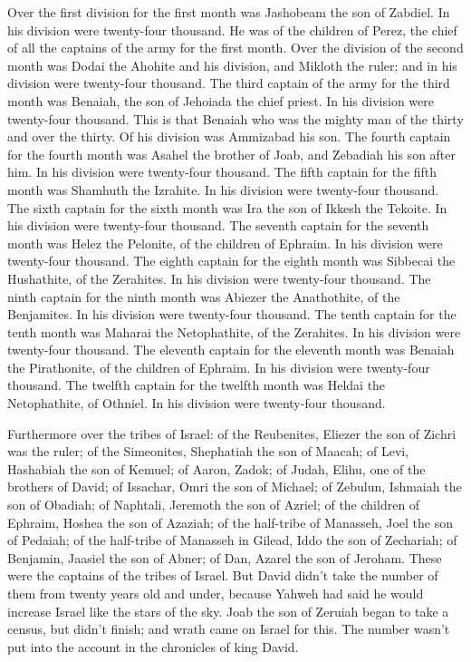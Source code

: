 Over the first division for the first month was Jashobeam
the son of Zabdiel. In his division were twenty-four thousand.
 He was of the children of Perez, the chief of all the
captains of the army for the first month.  Over the
division of the second month was Dodai the Ahohite and his division, and
Mikloth the ruler; and in his division were twenty-four thousand.
 The third captain of the army for the third month was
Benaiah, the son of Jehoiada the chief priest. In his division were
twenty-four thousand.  This is that Benaiah who was the
mighty man of the thirty and over the thirty. Of his division was
Ammizabad his son.  The fourth captain for the fourth
month was Asahel the brother of Joab, and Zebadiah his son after him. In
his division were twenty-four thousand.  The fifth captain
for the fifth month was Shamhuth the Izrahite. In his division were
twenty-four thousand.  The sixth captain for the sixth
month was Ira the son of Ikkesh the Tekoite. In his division were
twenty-four thousand.  The seventh captain for the
seventh month was Helez the Pelonite, of the children of Ephraim. In his
division were twenty-four thousand.  The eighth captain
for the eighth month was Sibbecai the Hushathite, of the Zerahites. In
his division were twenty-four thousand.  The ninth
captain for the ninth month was Abiezer the Anathothite, of the
Benjamites. In his division were twenty-four thousand. 
The tenth captain for the tenth month was Maharai the Netophathite, of
the Zerahites. In his division were twenty-four thousand.
 The eleventh captain for the eleventh month was Benaiah
the Pirathonite, of the children of Ephraim. In his division were
twenty-four thousand.  The twelfth captain for the
twelfth month was Heldai the Netophathite, of Othniel. In his division
were twenty-four thousand.

 Furthermore over the tribes of Israel: of the
Reubenites, Eliezer the son of Zichri was the ruler; of the Simeonites,
Shephatiah the son of Maacah;  of Levi, Hashabiah the son
of Kemuel; of Aaron, Zadok;  of Judah, Elihu, one of the
brothers of David; of Issachar, Omri the son of Michael; 
of Zebulun, Ishmaiah the son of Obadiah; of Naphtali, Jeremoth the son
of Azriel;  of the children of Ephraim, Hoshea the son of
Azaziah; of the half-tribe of Manasseh, Joel the son of Pedaiah;
 of the half-tribe of Manasseh in Gilead, Iddo the son of
Zechariah; of Benjamin, Jaasiel the son of Abner;  of
Dan, Azarel the son of Jeroham. These were the captains of the tribes of
Israel.  But David didn't take the number of them from
twenty years old and under, because Yahweh had said he would increase
Israel like the stars of the sky.  Joab the son of
Zeruiah began to take a census, but didn't finish; and wrath came on
Israel for this. The number wasn't put into the account in the
chronicles of king David.

